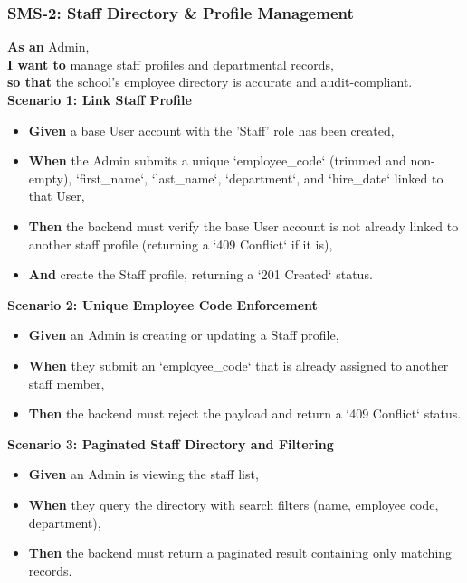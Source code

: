 \subsubsection{SMS-2: Staff Directory \& Profile Management}
\noindent \textbf{As an} Admin, \\
\noindent \textbf{I want to} manage staff profiles and departmental records, \\
\noindent \textbf{so that} the school's employee directory is accurate and audit-compliant. \\



\noindent\textbf{Scenario 1: Link Staff Profile}\\
\begin{itemize}
  \item \textbf{Given} a base User account with the 'Staff' role has been created,
  \item \textbf{When} the Admin submits a unique `employee\_code` (trimmed and non-empty), `first\_name`, `last\_name`, `department`, and `hire\_date` linked to that User,
  \item \textbf{Then} the backend must verify the base User account is not already linked to another staff profile (returning a `409 Conflict` if it is),
  \item \textbf{And} create the Staff profile, returning a `201 Created` status.
\end{itemize}


\noindent\textbf{Scenario 2: Unique Employee Code Enforcement}\\
\begin{itemize}
  \item \textbf{Given} an Admin is creating or updating a Staff profile,
  \item \textbf{When} they submit an `employee\_code` that is already assigned to another staff member,
  \item \textbf{Then} the backend must reject the payload and return a `409 Conflict` status.
\end{itemize}


\noindent\textbf{Scenario 3: Paginated Staff Directory and Filtering}\\
\begin{itemize}
  \item \textbf{Given} an Admin is viewing the staff list,
  \item \textbf{When} they query the directory with search filters (name, employee code, department),
  \item \textbf{Then} the backend must return a paginated result containing only matching records.
\end{itemize}


